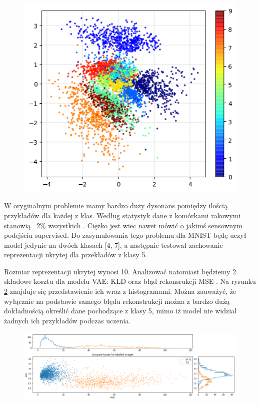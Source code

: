 \begin{figure}[h!]
    \centering
    \includegraphics[width=1.\textwidth]{images/mnist_2d}
    \caption{}
    \label{fig:mnist_2d}
\end{figure}

W oryginalnym problemie mamy bardzo duży dysonans pomiędzy ilością przykładów dla każdej z klas. Według statystyk dane z komórkami rakowymi stanowią ~2\% wszystkich . Ciężko jest wiec nawet mówić o jakimś sensownym podejściu supervised. Do zasymulowania tego problemu dla MNIST będę uczył model jedynie na dwóch klasach [4, 7], a następnie testował zachowanie reprezentacji ukrytej dla przekładów z klasy 5.

Rozmiar reprezentacji ukrytej wynosi 10. Analizować natomiast będziemy 2 składowe kosztu dla modelu VAE: KLD oraz błąd rekonsrukcji MSE . Na rysunku \ref{fig:mnist_compare} znajduje się przedstawienie ich wraz z histogramami. Można zauważyć, że wyłącznie na podstawie samego błędu rekonstrukcji można z bardzo dużą dokładnością określić dane pochodzące z klasy 5, mimo iż model nie widział żadnych ich przykładów podczas uczenia.

\begin{figure}[h!]
    \centering
    \includegraphics[width=1.0\textwidth]{images/mnist_compare}
    \caption{}
    \label{fig:mnist_compare}
\end{figure}

